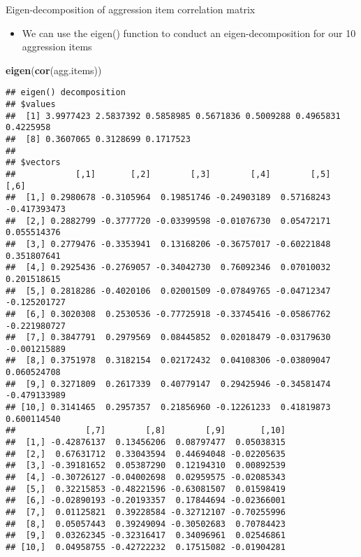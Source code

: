 \documentclass[
  ignorenonframetext,
]{beamer}
\newenvironment{Shaded}{\begin{snugshade}}{\end{snugshade}}
\newcommand{\KeywordTok}[1]{\textcolor[rgb]{0.13,0.29,0.53}{\textbf{#1}}}
\newcommand{\NormalTok}[1]{#1}
\providecommand{\tightlist}{%
  \setlength{\itemsep}{0pt}\setlength{\parskip}{0pt}}
\begin{document}
\begin{frame}[fragile]{Eigen-decomposition of aggression item
correlation matrix}
\protect\hypertarget{eigen-decomposition-of-aggression-item-correlation-matrix}{}

\begin{itemize}
\tightlist
\item
  We can use the eigen() function to conduct an eigen-decomposition for
  our 10 aggression items
\end{itemize}

\begin{Shaded}
\begin{Highlighting}[]
\KeywordTok{eigen}\NormalTok{(}\KeywordTok{cor}\NormalTok{(agg.items))}
\end{Highlighting}
\end{Shaded}

\begin{verbatim}
## eigen() decomposition
## $values
##  [1] 3.9977423 2.5837392 0.5858985 0.5671836 0.5009288 0.4965831 0.4225958
##  [8] 0.3607065 0.3128699 0.1717523
## 
## $vectors
##            [,1]       [,2]        [,3]        [,4]        [,5]         [,6]
##  [1,] 0.2980678 -0.3105964  0.19851746 -0.24903189  0.57168243 -0.417393473
##  [2,] 0.2882799 -0.3777720 -0.03399598 -0.01076730  0.05472171  0.055514376
##  [3,] 0.2779476 -0.3353941  0.13168206 -0.36757017 -0.60221848  0.351807641
##  [4,] 0.2925436 -0.2769057 -0.34042730  0.76092346  0.07010032  0.201518615
##  [5,] 0.2818286 -0.4020106  0.02001509 -0.07849765 -0.04712347 -0.125201727
##  [6,] 0.3020308  0.2530536 -0.77725918 -0.33745416 -0.05867762 -0.221980727
##  [7,] 0.3847791  0.2979569  0.08445852  0.02018479 -0.03179630 -0.001215889
##  [8,] 0.3751978  0.3182154  0.02172432  0.04108306 -0.03809047  0.060524708
##  [9,] 0.3271809  0.2617339  0.40779147  0.29425946 -0.34581474 -0.479133989
## [10,] 0.3141465  0.2957357  0.21856960 -0.12261233  0.41819873  0.600114540
##              [,7]        [,8]        [,9]       [,10]
##  [1,] -0.42876137  0.13456206  0.08797477  0.05038315
##  [2,]  0.67631712  0.33043594  0.44694048 -0.02205635
##  [3,] -0.39181652  0.05387290  0.12194310  0.00892539
##  [4,] -0.30726127 -0.04002698  0.02959575 -0.02085343
##  [5,]  0.32215853 -0.48221596 -0.63081507  0.01598419
##  [6,] -0.02890193 -0.20193357  0.17844694 -0.02366001
##  [7,]  0.01125821  0.39228584 -0.32712107 -0.70255996
##  [8,]  0.05057443  0.39249094 -0.30502683  0.70784423
##  [9,]  0.03262345 -0.32316417  0.34096961  0.02546861
## [10,]  0.04958755 -0.42722232  0.17515082 -0.01904281
\end{verbatim}

\end{frame}
\end{document}
